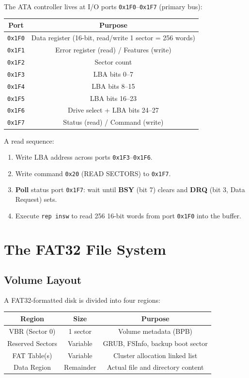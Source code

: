 \documentclass[12pt,a4paper]{report}
\begin{document}
The ATA controller lives at I/O ports \texttt{0x1F0}--\texttt{0x1F7} (primary bus):

\begin{center}
\begin{tabular}{|c|c|}
\hline
\textbf{Port} & \textbf{Purpose} \\
\hline
\texttt{0x1F0} & Data register (16-bit, read/write 1 sector = 256 words) \\
\texttt{0x1F1} & Error register (read) / Features (write) \\
\texttt{0x1F2} & Sector count \\
\texttt{0x1F3} & LBA bits 0--7 \\
\texttt{0x1F4} & LBA bits 8--15 \\
\texttt{0x1F5} & LBA bits 16--23 \\
\texttt{0x1F6} & Drive select + LBA bits 24--27 \\
\texttt{0x1F7} & Status (read) / Command (write) \\
\hline
\end{tabular}
\end{center}

A read sequence:
\begin{enumerate}
    \item Write LBA address across ports \texttt{0x1F3}--\texttt{0x1F6}.
    \item Write command \texttt{0x20} (READ SECTORS) to \texttt{0x1F7}.
    \item \textbf{Poll} status port \texttt{0x1F7}: wait until \textbf{BSY} (bit 7)
    clears and \textbf{DRQ} (bit 3, Data Request) sets.
    \item Execute \texttt{rep insw} to read 256 16-bit words from port \texttt{0x1F0}
    into the buffer.
\end{enumerate}

\section{The FAT32 File System}

\subsection{Volume Layout}

A FAT32-formatted disk is divided into four regions:

\begin{center}
\begin{tabular}{|c|c|c|}
\hline
\textbf{Region} & \textbf{Size} & \textbf{Purpose} \\
\hline
VBR (Sector 0) & 1 sector & Volume metadata (BPB) \\
Reserved Sectors & Variable & GRUB, FSInfo, backup boot sector \\
FAT Table(s) & Variable & Cluster allocation linked list \\
Data Region & Remainder & Actual file and directory content \\
\hline
\end{tabular}
\end{center}
\end{document}
